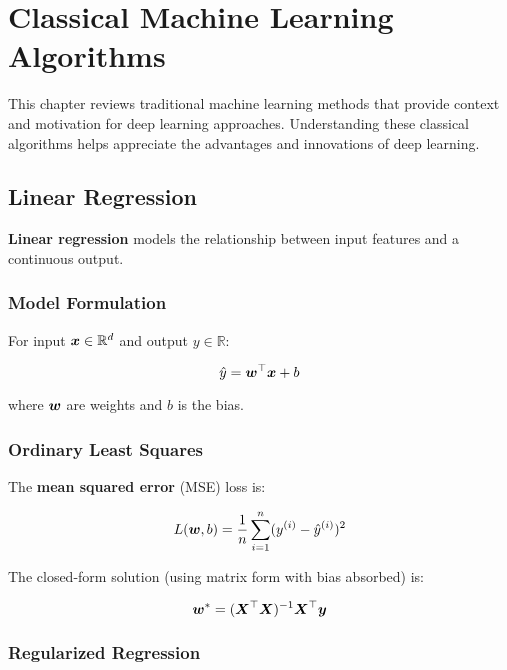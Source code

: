 
\chapter{Classical Machine Learning Algorithms}
\label{chap:classical-ml}

This chapter reviews traditional machine learning methods that provide context and motivation for deep learning approaches. Understanding these classical algorithms helps appreciate the advantages and innovations of deep learning.

\section{Linear Regression}
\label{sec:linear-regression}

\textbf{Linear regression} models the relationship between input features and a continuous output.

\subsection{Model Formulation}

For input $\boldsymbol{x} \in \mathbb{R}^d$ and output $y \in \mathbb{R}$:

\begin{equation}
\hat{y} = \boldsymbol{w}^\top \boldsymbol{x} + b
\end{equation}

where $\boldsymbol{w}$ are weights and $b$ is the bias.

\subsection{Ordinary Least Squares}

The \textbf{mean squared error} (MSE) loss is:

\begin{equation}
L(\boldsymbol{w}, b) = \frac{1}{n} \sum_{i=1}^{n} (y^{(i)} - \hat{y}^{(i)})^2
\end{equation}

The closed-form solution (using matrix form with bias absorbed) is:

\begin{equation}
\boldsymbol{w}^* = (\boldsymbol{X}^\top \boldsymbol{X})^{-1} \boldsymbol{X}^\top \boldsymbol{y}
\end{equation}

\subsection{Regularized Regression}


